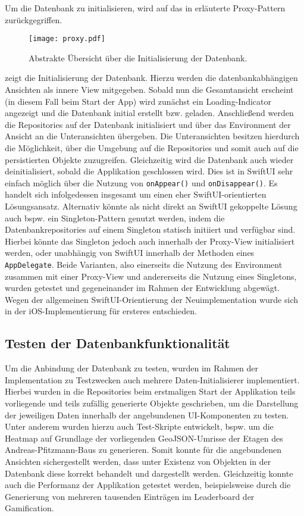 Um die Datenbank zu initialisieren, wird auf das in  erläuterte Proxy-Pattern zurückgegriffen.

\begin{figure}[H]
\texttt{[image: proxy.pdf]}
\caption{Abstrakte Übersicht über die Initialisierung der Datenbank.}\label{fig:proxy}
\end{figure}

\noindent {} zeigt die Initialisierung der Datenbank. Hierzu werden die datenbankabhängigen Ansichten als innere View mitgegeben. Sobald nun die Gesamtansicht erscheint (in diesem Fall beim Start der App) wird zunächst ein Loading-Indicator angezeigt und die Datenbank initial erstellt bzw. geladen.  Anschließend werden die Repositories auf der Datenbank initialisiert und über das Environment der Ansicht an die Unteransichten übergeben. Die Unteransichten besitzen hierdurch die Möglichkeit, über die Umgebung auf die Repositories und somit auch auf die persistierten Objekte zuzugreifen. Gleichzeitig wird die Datenbank auch wieder deinitialisiert, sobald die Applikation geschlossen wird. Dies ist in SwiftUI sehr einfach möglich über die Nutzung von \texttt{onAppear()} und \texttt{onDisappear()}. Es handelt sich infolgedessen insgesamt um einen eher SwiftUI-orientierten Lösungsansatz. Alternativ könnte als nicht direkt an SwiftUI gekoppelte Lösung auch bspw. ein Singleton-Pattern genutzt werden, indem die Datenbankrepositories auf einem Singleton statisch initiiert und verfügbar sind. Hierbei könnte das Singleton jedoch auch innerhalb der Proxy-View initialisiert werden, oder unabhängig von SwiftUI innerhalb der Methoden eines \texttt{AppDelegate}. Beide Varianten, also einerseits die Nutzung des Environment zusammen mit einer Proxy-View und andererseits die Nutzung eines Singletons, wurden getestet und gegeneinander im Rahmen der Entwicklung abgewägt. Wegen der allgemeinen SwiftUI-Orientierung der Neuimplementation wurde sich in der iOS-Implementierung für ersteres entschieden.

\subsection{Testen der Datenbankfunktionalität}

Um die Anbindung der Datenbank zu testen, wurden im Rahmen der Implementation zu Testzwecken auch mehrere Daten-Initialisierer implementiert. Hierbei wurden in die Repositories beim erstmaligen Start der Applikation teils vorliegende und teils zufällig generierte Objekte geschrieben, um die Darstellung der jeweiligen Daten innerhalb der angebundenen UI-Komponenten zu testen. Unter anderem wurden hierzu auch Test-Skripte entwickelt, bspw. um die Heatmap auf Grundlage der vorliegenden GeoJSON-Umrisse der Etagen des Andreas-Pfitzmann-Baus zu generieren. Somit konnte für die angebundenen Ansichten sichergestellt werden, dass unter Existenz von Objekten in der Datenbank diese korrekt behandelt und dargestellt werden. Gleichzeitig konnte auch die Performanz der Applikation getestet werden, beispielsweise durch die Generierung von mehreren tausenden Einträgen im Leaderboard der Gamification.

